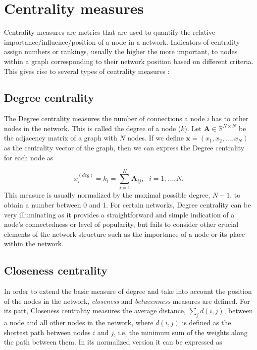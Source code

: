 \section{Centrality measures}
\label{sec:centra}
 Centrality measures are metrics that are used to quantify the relative importance/influence/position of a node in a network. Indicators of centrality assign numbers or rankings, usually the higher the more important, to nodes within a graph corresponding to their network position based on different criteria. This gives rise to several types of centrality measures \cite[Ch.\ 7]{newman2018networks}:

\subsection*{Degree centrality} The Degree centrality measures the number of connections a node $i$ has to other nodes in the network. This is called the degree of a node ($k$). Let $\mathbf{A}\in \mathbb{R}^{N\times N}$ be the adjacency matrix of a graph with $N$ nodes. If we define $\mathbf{x}=(x_1,x_2,\dots,x_N)$ as the centrality vector of the graph, then we can express the Degree centrality for each node as 

\begin{equation}
    x_i^{(deg)}=k_i=\sum_{j=1}^{N}\mathbf{A}_{ij}, ~~~i = 1,\dots, N.
\end{equation}
This measure is usually normalized by the maximal possible degree, $N − 1$, to obtain a number between 0 and 1. For certain networks, Degree centrality can be very illuminating as it provides a straightforward and simple indication of a node's connectedness or level of popularity, but fails to consider other crucial elements of the network structure such as the importance of a node or its place within the network.

\subsection*{Closeness centrality} In order to extend the basic measure of degree and take into account the position of the nodes in the network, \textit{closeness} and \textit{betweenness} measures are defined. For its part, Closeness centrality measures the average distance, $\sum_{j}^{}d(i,j)$, between a node and all other nodes in the network, where $d(i,j)$ is defined as the shortest path between nodes $i$ and $j$, i.e, the minimum sum of the weights along the path between them. In its normalized version it can be expressed as

